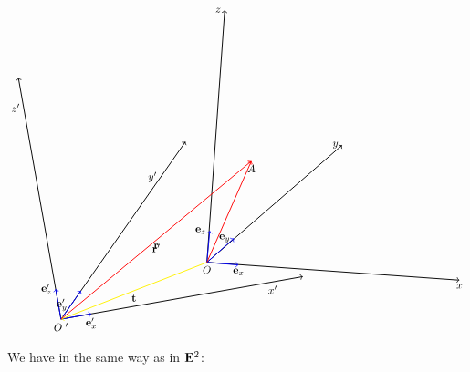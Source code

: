 \documentclass[12pt]{article}
\numberwithin{equation}{section}
\begin{document}
\begin{equation*}
\begin{tikzpicture} [rotate=10]
\draw 
[ <-> , thick] 
(8,0)--(0,0)--(0,8);
\draw 
[ -> , thick] 
(0,0)--(5,5);


\draw [thick, ->,blue] (0,0)--(1,0);
\node [below] at (1,0) {$\e'_x$};

\draw [thick, ->,blue] (0,0)--(0,1);
\node [left] at (0,1) {$\e'_z$};

\draw [thick, ->,blue] (0,0)--(0.8,0.8);
\node [left] at (0.4,0.4) {$\e'_y$};


\node [below] at (7,0) {$x'$};
\node [left] at (0,7) {$z'$};
\node [left] at (4,4) {$y'$};


\node [below] at (0,0) {$O^{\,\,\prime}$};


 
\draw 
[ <-> , thick] 
(13,-1)--(5,1)--(7,9);
\draw 
[ -> , thick] 
(5,1)--(10,4);


\draw [thick, ->,blue] (5,1)--(6,21pt);
\node [below] at (6,21pt) {$\e_x$};

\draw [thick, ->,blue] (5,1)--(150pt,2);
\node [left] at (150pt,2) {$\e_z$};

\draw [thick, ->,blue] (5,1)--(6,46pt);
\node [left] at (6,46pt) {$\e_y$};


\node [below] at (13,-1) {$x$};
\node [left] at (7,9) {$z$};
\node [left] at (10,4) {$y$};


\node [below] at (5,1) {$O$};

\draw [thick, yellow,->] (5,1)--(0,0);
\draw [thick, red,->] (0,0)--(7,4);
\draw [thick, red,->] (5,1)--(7,4);


\node [below] at (2.5,0.5) {$\bf t$};
\node [below] at (3.5,2) {$ \r'$};
\node [below] at (3.5,2) {$\r$};
\node [below] at (7,4) {$A$};


\end{tikzpicture}
\end{equation*}

We have in the same way as in ${\bf E}^2$:
\end{document}
